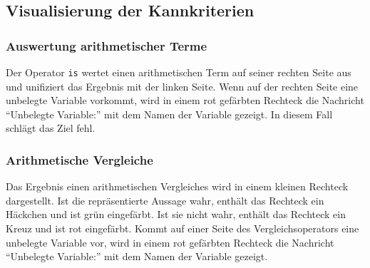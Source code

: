 \documentclass[parskip=full,11pt,twoside]{scrartcl}
\begin{document}
\begin{minipage}{\linewidth}
\end{minipage}

\begin{minipage}{\linewidth}
\end{minipage}

\subsection{Visualisierung der Kannkriterien}

\subsubsection{Auswertung arithmetischer Terme}

Der Operator \texttt{is} wertet einen arithmetischen Term auf seiner rechten Seite aus und unifiziert das Ergebnis mit der linken Seite.
Wenn auf der rechten Seite eine unbelegte Variable vorkommt, wird in einem rot gefärbten Rechteck die Nachricht \enquote{Unbelegte Variable:} mit dem Namen der Variable gezeigt.
In diesem Fall schlägt das Ziel fehl.

\begin{minipage}{\linewidth}
\end{minipage}

\subsubsection{Arithmetische Vergleiche}

Das Ergebnis einen arithmetischen Vergleiches wird in einem kleinen Rechteck dargestellt.
Ist die repräsentierte Aussage wahr, enthält das Rechteck ein Häckchen und ist grün eingefärbt.
Ist sie nicht wahr, enthält das Rechteck ein Kreuz und ist rot eingefärbt.
Kommt auf einer Seite des Vergleichsoperators eine unbelegte Variable vor, wird in einem rot gefärbten Rechteck die Nachricht \enquote{Unbelegte Variable:} mit dem Namen der Variable gezeigt.
\end{document}
